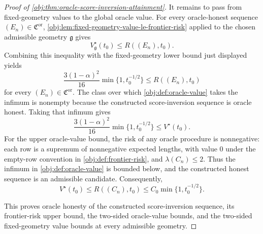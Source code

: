 \documentclass[11pt]{article}
\begin{document}
\begin{proof}[Proof of \cref{obj:thm:oracle-score-inversion-attainment}]
It remains to pass from fixed-geometry values to the global oracle value. For every oracle-honest sequence \((E_n)\in\mathfrak C^{\mathrm{or}}\), \cref{obj:lem:fixed-geometry-value-le-frontier-risk} applied to the chosen admissible geometry \(\mathfrak g\) gives
\[
V_{\mathfrak g}^\star(t_0)
\le
R((E_n),t_0).
\]
Combining this inequality with the fixed-geometry lower bound just displayed yields
\[
\frac{3(1-\alpha)^2}{16}
\min\{1,t_0^{-1/2}\}
\le
R((E_n),t_0)
\]
for every \((E_n)\in\mathfrak C^{\mathrm{or}}\). The class over which \cref{obj:def:oracle-value} takes the infimum is nonempty because the constructed score-inversion sequence is oracle honest. Taking that infimum gives
\[
\frac{3(1-\alpha)^2}{16}
\min\{1,t_0^{-1/2}\}
\le
V^\star(t_0).
\]
For the upper oracle-value bound, the risk of any oracle procedure is nonnegative: each row is a supremum of nonnegative expected lengths, with value \(0\) under the empty-row convention in \cref{obj:def:frontier-risk}, and \(\lambda(C_n)\le2\). Thus the infimum in \cref{obj:def:oracle-value} is bounded below, and the constructed honest sequence is an admissible candidate. Consequently,
\[
V^\star(t_0)
\le
R((C_n),t_0)
\le
C_0\min\{1,t_0^{-1/2}\}.
\] %

This proves oracle honesty of the constructed score-inversion sequence, its frontier-risk upper bound, the two-sided oracle-value bounds, and the two-sided fixed-geometry value bounds at every admissible geometry.
\end{proof}
\end{document}
